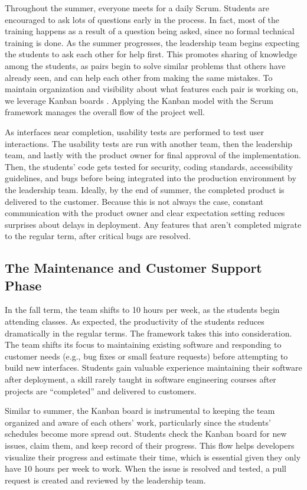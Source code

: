 Throughout the summer, everyone meets for a daily Scrum. Students are encouraged to ask lots of questions early in the process. In fact, most of the training happens as a result of a question being asked, since no formal technical training is done. As the summer progresses, the leadership team begins expecting the students to ask each other for help first. This promotes sharing of knowledge among the students, as pairs begin to solve similar problems that others have already seen, and can help each other from making the same mistakes. To maintain organization and visibility about what features each pair is working on, we leverage Kanban boards \cite{anderson2010kanban}. Applying the Kanban model with the Scrum framework manages the overall flow of the project well.

As interfaces near completion, usability tests \cite{usabilitytesting} are performed to test user interactions. The usability tests are run with another team, then the leadership team, and lastly with the product owner for final approval of the implementation. Then, the students’ code gets tested for security, coding standards, accessibility guidelines, and bugs before being integrated into the production environment by the leadership team. Ideally, by the end of summer, the completed product is delivered to the customer. Because this is not always the case, constant communication with the product owner and clear expectation setting reduces surprises about delays in deployment. Any features that aren't completed migrate to the regular term, after critical bugs are resolved.

\subsection{The Maintenance and Customer Support Phase}
In the fall term, the team shifts to 10 hours per week, as the students begin attending classes. As expected, the productivity of the students reduces dramatically in the regular terms. The framework takes this into consideration. The team shifts its focus to maintaining existing software and responding to customer needs (e.g., bug fixes or small feature requests) before attempting to build new interfaces. Students gain valuable experience maintaining their software after deployment, a skill rarely taught in software engineering courses after projects are ``completed'' and delivered to customers.

Similar to summer, the Kanban board is instrumental to keeping the team organized and aware of each others' work, particularly since the students' schedules become more spread out. Students check the Kanban board for new issues, claim them, and keep record of their progress. This flow helps developers visualize their progress and estimate their time, which is essential given they only have 10 hours per week to work. When the issue is resolved and tested, a pull request is created and reviewed by the leadership team.
